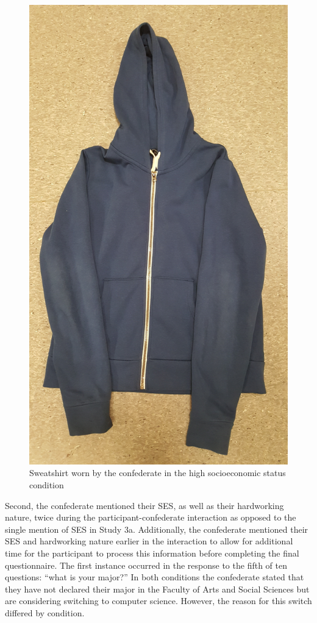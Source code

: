 \documentclass{sfuthesis}
\begin{document}
\begin{figure}
  \begin{center}
    \includegraphics[scale=.90]{Fig4-1b.png}
    \caption{Sweatshirt worn by the confederate in the high socioeconomic status condition}
    \label{fig:eighthfig}
  \end{center}
\end{figure}

Second, the confederate mentioned their SES, as well as their hardworking nature, twice during the participant-confederate interaction as opposed to the single mention of SES in Study 3a. Additionally, the confederate mentioned their SES and hardworking nature earlier in the interaction to allow for additional time for the participant to process this information before completing the final questionnaire. The first instance occurred in the response to the fifth of ten questions: “what is your major?” In both conditions the confederate stated that they have not declared their major in the Faculty of Arts and Social Sciences but are considering switching to computer science. However, the reason for this switch differed by condition.
\end{document}
